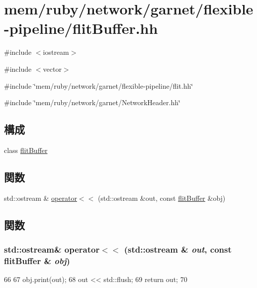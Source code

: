 \hypertarget{flitBuffer_8hh}{
\section{mem/ruby/network/garnet/flexible-\/pipeline/flitBuffer.hh}
\label{flitBuffer_8hh}
}
{\ttfamily \#include $<$iostream$>$}\par
{\ttfamily \#include $<$vector$>$}\par
{\ttfamily \#include \char`\"{}mem/ruby/network/garnet/flexible-\/pipeline/flit.hh\char`\"{}}\par
{\ttfamily \#include \char`\"{}mem/ruby/network/garnet/NetworkHeader.hh\char`\"{}}\par
\subsection*{構成}
\begin{DoxyCompactItemize}
\item 
class \hyperlink{classflitBuffer}{flitBuffer}
\end{DoxyCompactItemize}
\subsection*{関数}
\begin{DoxyCompactItemize}
\item 
std::ostream \& \hyperlink{flitBuffer_8hh_a775ff7bbed56cb95accb2a995fc14eca}{operator$<$$<$} (std::ostream \&out, const \hyperlink{classflitBuffer}{flitBuffer} \&obj)
\end{DoxyCompactItemize}


\subsection{関数}
\hypertarget{flitBuffer_8hh_a775ff7bbed56cb95accb2a995fc14eca}{
\subsubsection[{operator$<$$<$}]{\setlength{\rightskip}{0pt plus 5cm}std::ostream\& operator$<$$<$ (std::ostream \& {\em out}, \/  const {\bf flitBuffer} \& {\em obj})}}
\label{flitBuffer_8hh_a775ff7bbed56cb95accb2a995fc14eca}



\begin{DoxyCode}
66 {
67     obj.print(out);
68     out << std::flush;
69     return out;
70 }
\end{DoxyCode}
